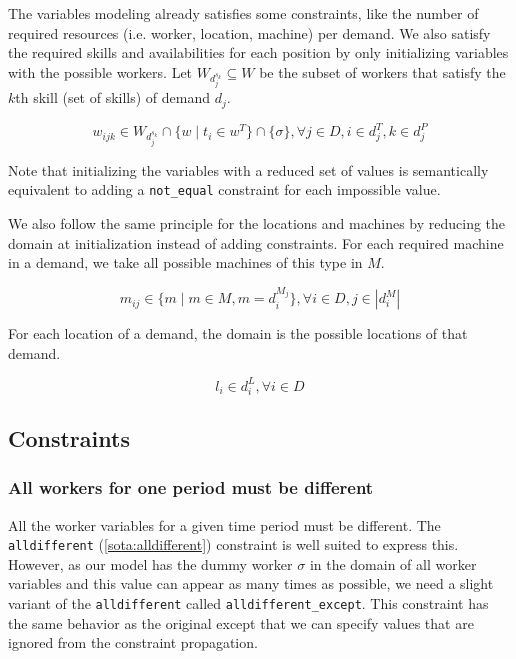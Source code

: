\documentclass[../../thesis.tex]{subfiles}
\begin{document}
The variables modeling already satisfies some constraints, like the number of required resources (i.e. worker, location, machine)
per demand. We also satisfy the required skills and availabilities for each position by only initializing variables with the 
possible workers. Let $W_{d^{s_k}_j} \subseteq W$ be the subset of workers that satisfy the $k$th skill (set of skills) of demand $d_j$.

\begin{equation}
  \label{wdomain}
  w_{ijk} \in W_{d^{s_k}_j} \cap \{ w \mid t_i \in w^T \} \cap \{ \sigma \}, \forall j \in D, i \in d^T_j, k \in d^P_j
\end{equation}

Note that initializing the variables with a reduced set of values is semantically equivalent to adding a \texttt{not\_equal} constraint for each impossible value.


We also follow the same principle for the locations and machines by reducing the domain at initialization instead of adding constraints.
For each required machine in a demand, we take all possible machines of this type in $M$.

\begin{equation}
  \label{mdomain}
  m_{ij} \in \{ m \mid m \in M, m = d_i^{M_j}  \}, \forall i \in D, j \in |d_i^M|
\end{equation}

For each location of a demand, the domain is the possible locations of that demand.

\begin{equation}
  \label{ldomain}
  l_i \in d_i^L, \forall i \in D
\end{equation}


\subsection{Constraints}

\subsubsection{All workers for one period must be different}

All the worker variables for a given time period must be different. 
The \texttt{alldifferent} (\autoref{sota:alldifferent}) constraint is well suited to express this. 
However, as our model has the dummy worker $\sigma$ in the domain of all worker variables and this value 
can appear as many times as possible, we need a slight variant of the \texttt{alldifferent} called \texttt{alldifferent\_except}. 
This constraint has the same behavior as the original except that we can specify values that are ignored from 
the constraint propagation.
\end{document}
